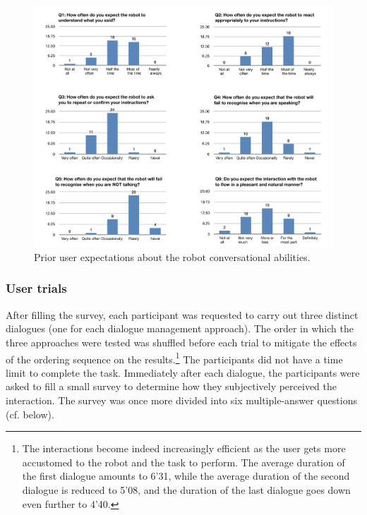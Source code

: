 \begin{figure}[h]
\begin{center}
\includegraphics[scale=0.5]{imgs/expectations.pdf}
\end{center} 
\caption{Prior user expectations about the robot conversational abilities.}
\label{fig:expectations}
\end{figure}

\subsubsection*{User trials}

After filling the survey, each participant was requested to carry out three distinct dialogues (one for each dialogue management approach).  The order in which the three approaches were tested was shuffled before each trial to mitigate the effects of the ordering sequence on the results.\footnote{The interactions become indeed increasingly efficient as the user gets more accustomed to the robot and the task to perform.  The average duration of the first dialogue amounts to 6'31, while the average duration of the second dialogue is reduced to 5'08, and the duration of the last dialogue goes down even further to 4'40.}  The participants did not have a time limit to complete the task. Immediately after each dialogue, the participants were asked to fill a small survey to determine how they subjectively perceived the interaction.  The survey was once more divided into six multiple-answer questions (cf. below).  


